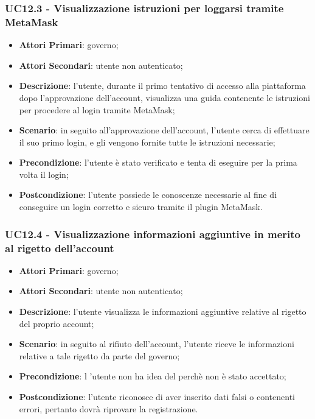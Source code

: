 \subsubsection{UC12.3 - Visualizzazione istruzioni per loggarsi tramite MetaMask\glosp}
\begin{itemize}
	\item \textbf{Attori Primari}:
	governo;
	\item \textbf{Attori Secondari}:
	utente non autenticato;
	\item \textbf{Descrizione}: l'utente, durante il primo tentativo di accesso alla piattaforma dopo l'approvazione dell'account, visualizza una guida contenente le istruzioni per procedere al login tramite MetaMask\glosp;
	\item \textbf{Scenario}: in seguito all'approvazione dell'account, l'utente cerca di effettuare il suo primo login, e gli vengono fornite tutte le istruzioni necessarie;
	\item \textbf{Precondizione}: l'utente è stato verificato e tenta di eseguire per la prima volta il login;
	\item \textbf{Postcondizione}: l'utente possiede le conoscenze necessarie al fine di conseguire un login corretto e sicuro tramite il plugin MetaMask\glosp.
\end{itemize}
\subsubsection{UC12.4 - Visualizzazione informazioni aggiuntive in merito al rigetto dell'account}
\begin{itemize}
	\item \textbf{Attori Primari}:
	governo;
	\item \textbf{Attori Secondari}:
	utente non autenticato;
	\item \textbf{Descrizione}: l'utente visualizza le informazioni aggiuntive relative al rigetto del proprio account;
	\item \textbf{Scenario}: in seguito al rifiuto dell'account, l'utente riceve le informazioni relative a tale rigetto da parte del governo;
	\item \textbf{Precondizione}: l 'utente non ha idea del perchè non è stato accettato;
	\item \textbf{Postcondizione}: l'utente riconosce di aver inserito dati falsi o contenenti errori, pertanto dovrà riprovare la registrazione.
\end{itemize} 
